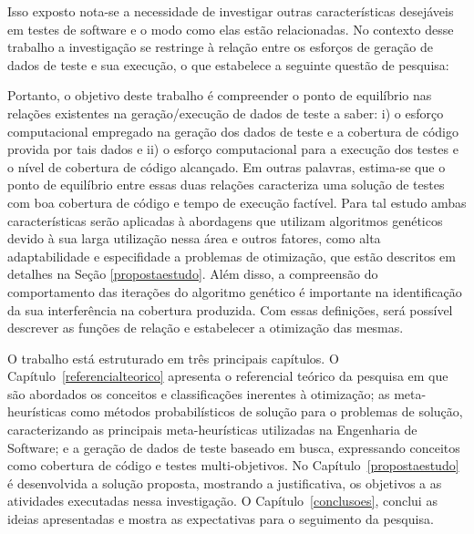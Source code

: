Isso exposto nota-se a necessidade de investigar outras características desejáveis em testes de software e o modo como elas estão relacionadas. No contexto desse trabalho a investigação se restringe à relação entre os esforços de geração de dados de teste e sua execução, o que estabelece a seguinte questão de pesquisa:

 
\vspace{1.0cm}
\vspace{1.0cm}


Portanto, o objetivo deste trabalho é compreender o ponto de equilíbrio nas relações existentes na geração/execução de dados de teste a saber: i) o esforço computacional empregado na geração dos dados de teste e a cobertura de código provida por tais dados e ii) o esforço computacional para a execução dos testes e o nível de cobertura de código alcançado. Em outras palavras, estima-se que o ponto de equilíbrio entre essas duas relações caracteriza  uma solução de testes com boa cobertura de código e tempo de execução factível. Para tal estudo ambas características serão aplicadas à abordagens que utilizam algoritmos genéticos devido à sua larga utilização nessa área e outros fatores, como alta adaptabilidade e especifidade a problemas de otimização, que estão descritos em detalhes na Seção \ref{propostaestudo}. Além disso, a compreensão do comportamento das iterações do algoritmo genético é importante na identificação da sua interferência na cobertura produzida. Com essas definições, será possível descrever as funções de relação e estabelecer a otimização das mesmas. 


O trabalho está estruturado em três principais capítulos. O Capítulo~\ref{referencialteorico} apresenta o referencial teórico da pesquisa em que são abordados os conceitos e classificações inerentes à otimização; as meta-heurísticas como métodos probabilísticos de solução para o problemas de solução, caracterizando as principais meta-heurísticas utilizadas na Engenharia de Software; e a geração de dados de teste baseado em busca, expressando conceitos como cobertura de código e testes multi-objetivos. No Capítulo~\ref{propostaestudo} é desenvolvida a solução proposta, mostrando a justificativa, os objetivos a as atividades executadas nessa investigação. O Capítulo~\ref{conclusoes}, conclui as ideias apresentadas e mostra as expectativas para o seguimento da pesquisa.